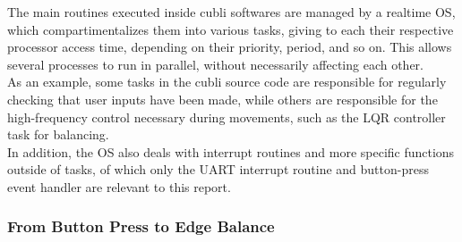 The main routines executed inside cubli softwares are managed by a realtime OS, which compartimentalizes them into various tasks, giving to each their respective processor access time, depending on their priority, period, and so on. This allows several processes to run in parallel, without necessarily affecting each other.\\

As an example, some tasks in the cubli source code are responsible for regularly checking that user inputs have been made, while others are responsible for the high-frequency control necessary during movements, such as the LQR controller task for balancing.\\

In addition, the OS also deals with interrupt routines and more specific functions outside of tasks, of which only the UART interrupt routine and button-press event handler are relevant to this report.\\

\subsubsection{From Button Press to Edge Balance}

